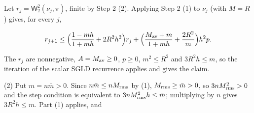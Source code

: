 \documentclass[11pt,a4paper]{report}
\begin{document}
Let \(r_j=\mathsf W_2^2(\nu_j,\pi)\), finite by Step 2 (2). Applying Step 2 (1) to \(\nu_j\) (with \(M=R\)) gives, for every \(j\),


\[r_{j+1}\le\Bigl(\frac{1-mh}{1+mh}+2R^2h^2\Bigr)r_j+\Bigl(\frac{M_{\rm av}+m}{1+mh}+\frac{2R^2}m\Bigr)h^2p.\]


The \(r_j\) are nonnegative, \(A=M_{\rm av}\ge0\), \(p\ge0\), \(m^2\le R^2\) and \(3R^2h\le m\), so the iteration of the scalar SGLD recurrence applies and gives the claim.




(2) Put \(m=n\bar m>0\). Since \(n\bar m\le nM_{\rm rms}\) by (1), \(M_{\rm rms}\ge\bar m>0\), so \(3nM_{\rm rms}^2>0\) and the step condition is equivalent to \(3nM_{\rm rms}^2h\le\bar m\); multiplying by \(n\) gives \(3R^2h\le m\). Part (1) applies, and
\end{document}
